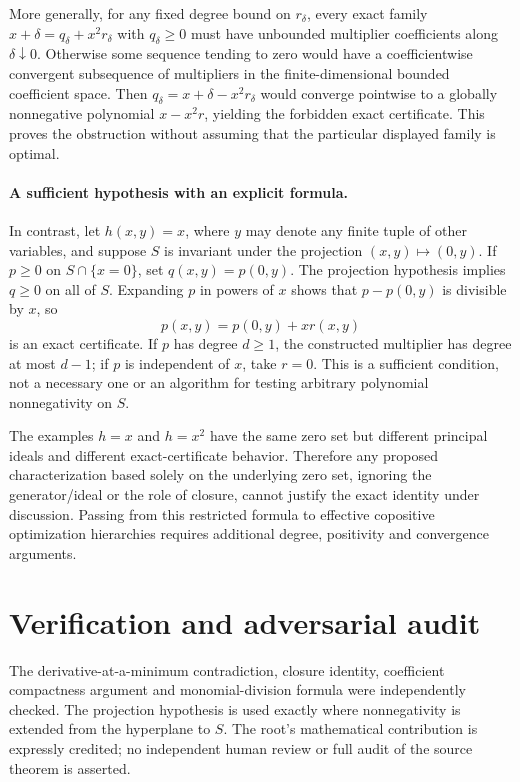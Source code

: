 \documentclass[11pt]{article}
\begin{document}
More generally, for any fixed degree bound on $r_\delta$, every exact family $x+\delta=q_\delta+x^2r_\delta$ with $q_\delta\ge0$ must have unbounded multiplier coefficients along $\delta\downarrow0$. Otherwise some sequence tending to zero would have a coefficientwise convergent subsequence of multipliers in the finite-dimensional bounded coefficient space. Then $q_\delta=x+\delta-x^2r_\delta$ would converge pointwise to a globally nonnegative polynomial $x-x^2r$, yielding the forbidden exact certificate. This proves the obstruction without assuming that the particular displayed family is optimal.

\paragraph{A sufficient hypothesis with an explicit formula.}
In contrast, let $h(x,y)=x$, where $y$ may denote any finite tuple of other variables, and suppose $S$ is invariant under the projection $(x,y)\mapsto(0,y)$. If $p\ge0$ on $S\cap\{x=0\}$, set $q(x,y)=p(0,y)$. The projection hypothesis implies $q\ge0$ on all of $S$. Expanding $p$ in powers of $x$ shows that $p-p(0,y)$ is divisible by $x$, so
\[
 p(x,y)=p(0,y)+x r(x,y)
\]
is an exact certificate. If $p$ has degree $d\ge1$, the constructed multiplier has degree at most $d-1$; if $p$ is independent of $x$, take $r=0$. This is a sufficient condition, not a necessary one or an algorithm for testing arbitrary polynomial nonnegativity on $S$.

The examples $h=x$ and $h=x^2$ have the same zero set but different principal ideals and different exact-certificate behavior. Therefore any proposed characterization based solely on the underlying zero set, ignoring the generator/ideal or the role of closure, cannot justify the exact identity under discussion. Passing from this restricted formula to effective copositive optimization hierarchies requires additional degree, positivity and convergence arguments.
\section{Verification and adversarial audit}
The derivative-at-a-minimum contradiction, closure identity, coefficient compactness argument and monomial-division formula were independently checked. The projection hypothesis is used exactly where nonnegativity is extended from the hyperplane to $S$. The root's mathematical contribution is expressly credited; no independent human review or full audit of the source theorem is asserted.
\end{document}

